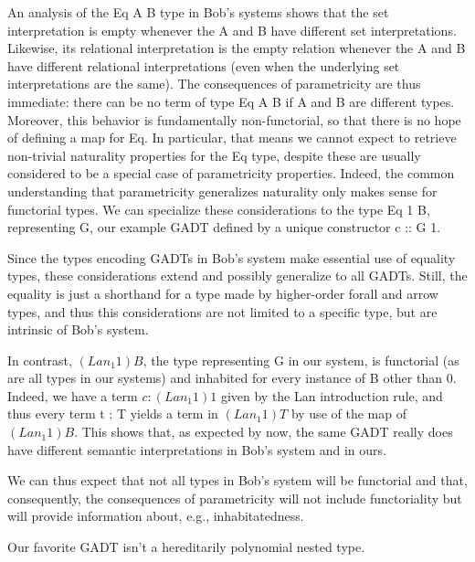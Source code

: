 \documentclass[acmsmall,screen,review,anonymous]{acmart}
\theoremstyle{definition}
\begin{document}
An analysis of the Eq A B type in Bob's systems shows that the set
interpretation is empty whenever the A and B have different set
interpretations.  Likewise, its relational interpretation is the empty
relation whenever the A and B have different relational
interpretations (even when the underlying set interpretations are the
same).  The consequences of parametricity are thus immediate: there
can be no term of type Eq A B if A and B are different types.
Moreover, this behavior is fundamentally non-functorial, so that there
is no hope of defining a map for Eq.  In particular, that means we
cannot expect to retrieve non-trivial naturality properties for the Eq
type, despite these are usually considered to be a special case of
parametricity properties.  Indeed, the common understanding that
parametricity generalizes naturality only makes sense for functorial
types.  We can specialize these considerations to the type Eq 1 B,
representing G, our example GADT defined by a unique constructor c ::
G 1.

Since the types encoding GADTs in Bob's system make essential use
of equality types, these considerations extend and possibly generalize
to all GADTs.  Still, the equality is just a shorthand for a type made
by higher-order forall and arrow types, and thus this considerations
are not limited to a specific type, but are intrinsic of Bob's
system.

In contrast, $(Lan_1 1) B$, the type representing G in our system, is
functorial (as are all types in our systems) and inhabited for every
instance of B other than 0.  Indeed, we have a term $c : (Lan_1 1) 1$
given by the Lan introduction rule, and thus every term t : T yields a
term in $(Lan_1 1) T$ by use of the map of $(Lan_1 1) B$.  This shows
that, as expected by now, the same GADT really does have different
semantic interpretations in Bob's system and in ours.


We can thus expect that not all types in Bob's system will
be functorial and that, consequently, the consequences of
parametricity will not include functoriality but will provide
information about, e.g., inhabitatedness.


 
{\color{blue} Our favorite GADT isn't a hereditarily
  polynomial nested type.}
\end{document}
